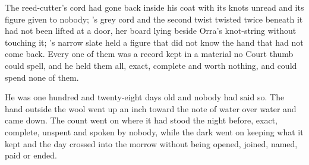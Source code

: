 The reed-cutter's cord had gone back inside his coat with its knots unread and its figure given to nobody; 's grey cord and the second twist twisted twice beneath it had not been lifted at a door, her board lying beside Orra's knot-string without touching it; 's narrow slate held a figure that did not know the hand that had not come back. Every one of them was a record kept in a material no Court thumb could spell, and he held them all, exact, complete and worth nothing, and could spend none of them.

He was one hundred and twenty-eight days old and nobody had said so. The hand outside the wool went up an inch toward the note of water over water and came down. The count went on where it had stood the night before, exact, complete, unspent and spoken by nobody, while the dark went on keeping what it kept and the day crossed into the morrow without being opened, joined, named, paid or ended.
